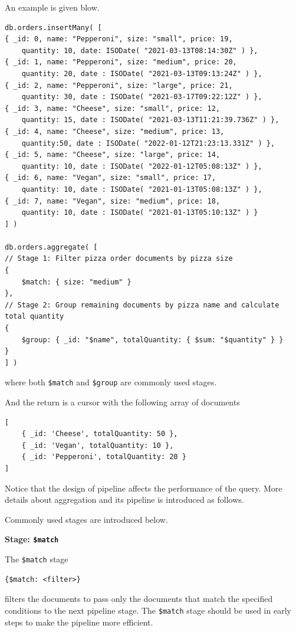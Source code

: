 An example is given blow.
\begin{lstlisting}
db.orders.insertMany( [
{ _id: 0, name: "Pepperoni", size: "small", price: 19,
	quantity: 10, date: ISODate( "2021-03-13T08:14:30Z" ) },
{ _id: 1, name: "Pepperoni", size: "medium", price: 20,
	quantity: 20, date : ISODate( "2021-03-13T09:13:24Z" ) },
{ _id: 2, name: "Pepperoni", size: "large", price: 21,
	quantity: 30, date : ISODate( "2021-03-17T09:22:12Z" ) },
{ _id: 3, name: "Cheese", size: "small", price: 12,
	quantity: 15, date : ISODate( "2021-03-13T11:21:39.736Z" ) },
{ _id: 4, name: "Cheese", size: "medium", price: 13,
	quantity:50, date : ISODate( "2022-01-12T21:23:13.331Z" ) },
{ _id: 5, name: "Cheese", size: "large", price: 14,
	quantity: 10, date : ISODate( "2022-01-12T05:08:13Z" ) },
{ _id: 6, name: "Vegan", size: "small", price: 17,
	quantity: 10, date : ISODate( "2021-01-13T05:08:13Z" ) },
{ _id: 7, name: "Vegan", size: "medium", price: 18,
	quantity: 10, date : ISODate( "2021-01-13T05:10:13Z" ) }
] )

db.orders.aggregate( [
// Stage 1: Filter pizza order documents by pizza size
{
	$match: { size: "medium" }
},
// Stage 2: Group remaining documents by pizza name and calculate total quantity
{
	$group: { _id: "$name", totalQuantity: { $sum: "$quantity" } }
}
] )
\end{lstlisting}
where both \verb|$match| and \verb|$group| are commonly used stages.

And the return is a cursor with the following array of documents
\begin{lstlisting}
[
	{ _id: 'Cheese', totalQuantity: 50 },
	{ _id: 'Vegan', totalQuantity: 10 },
	{ _id: 'Pepperoni', totalQuantity: 20 }
]
\end{lstlisting}

Notice that the design of pipeline affects the performance of the query. More details about aggregation and its pipeline is introduced as follows.

Commonly used stages are introduced below.

\vspace{0.1in}
\noindent \textbf{Stage: \texttt{\$match}}
\vspace{0.1in}

The \verb|$match| stage
\begin{lstlisting}
{$match: <filter>}
\end{lstlisting}
filters the documents to pass only the documents that match the specified conditions to the next pipeline stage. The \verb|$match| stage should be used in early steps to make the pipeline more efficient.

